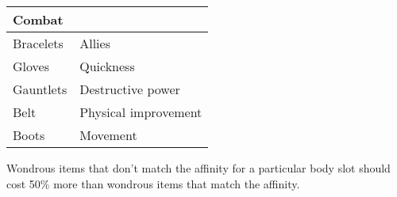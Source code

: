 \begin{longtable}{llll}
{\begin{minipage}[t]{2.395in}
Combat\end{minipage}}\\
\hline
\multicolumn{1}{|p{1.700in}|}{\begin{minipage}[t]{1.700in}\raggedright
Bracelets \end{minipage}} & \multicolumn{3}{p{2.395in}|}{\begin{minipage}[t]{2.395in}\raggedright
Allies\end{minipage}}\\
\hline
\multicolumn{1}{|p{1.700in}|}{\begin{minipage}[t]{1.700in}\raggedright
Gloves \end{minipage}} & \multicolumn{3}{p{2.395in}|}{\begin{minipage}[t]{2.395in}\raggedright
Quickness\end{minipage}}\\
\hline
\multicolumn{1}{|p{1.700in}|}{\begin{minipage}[t]{1.700in}\raggedright
Gauntlets \end{minipage}} & \multicolumn{3}{p{2.395in}|}{\begin{minipage}[t]{2.395in}\raggedright
Destructive power\end{minipage}}\\
\hline
\multicolumn{1}{|p{1.700in}|}{\begin{minipage}[t]{1.700in}\raggedright
Belt \end{minipage}} & \multicolumn{3}{p{2.395in}|}{\begin{minipage}[t]{2.395in}\raggedright
Physical improvement\end{minipage}}\\
\hline
\multicolumn{1}{|p{1.700in}|}{\begin{minipage}[t]{1.700in}\raggedright
Boots \end{minipage}} & \multicolumn{3}{p{2.395in}|}{\begin{minipage}[t]{2.395in}\raggedright
Movement\end{minipage}}\\
\hline
\end{longtable}

Wondrous items that don't match the affinity for a particular body slot should 
cost 50\% more than wondrous items that match the affinity.
